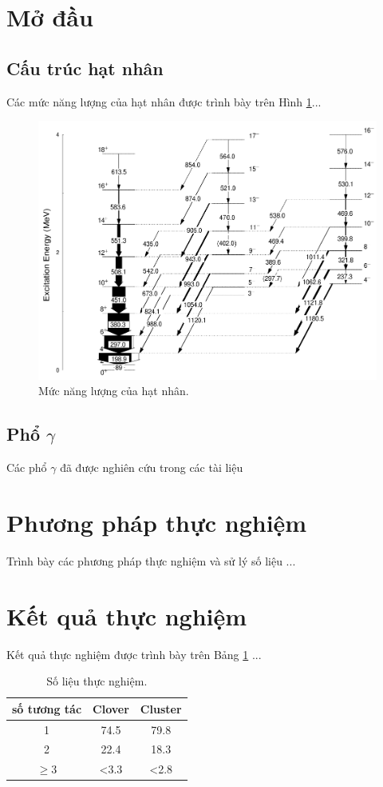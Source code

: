 \documentclass[12pt, a4paper]{article}
\begin{document}
\begin{multicols}{2}

\section{Mở đầu}
\subsection{Cấu trúc hạt nhân}
Các mức năng lượng của hạt nhân được trình bày trên Hình \ref{fig:nangluong}...

\begin{figure}[H]
	\centering
	\includegraphics[width=0.7\linewidth]{156Gd.png}
	\caption{Mức năng lượng của hạt nhân.}
	\label{fig:nangluong}
\end{figure}

\subsection{Phổ $\gamma$}
Các phổ $\gamma$ đã được nghiên cứu trong các tài liệu \cite{bib_Bazzaco, bib_Simpson}

\section{Phương pháp thực nghiệm}
Trình bày các phương pháp thực nghiệm và sử lý số liệu ...

\section{Kết quả thực nghiệm}
Kết quả thực nghiệm được trình bày trên Bảng \ref{tab:solieu} ...
 
\begin{table}[H]
\centering
	\caption{Số liệu thực nghiệm.}
	\label{tab:solieu} 
	\begin{tabular}{ccc}
		\hline
		số tương tác	& Clover 	& Cluster\\
		\hline
		1	& 74.5 & 79.8\\
		2	& 22.4 & 18.3\\
		$\ge$3	& <3.3 & <2.8\\
		\hline
	\end{tabular}
\end{table}


\end{multicols}
\end{document}
